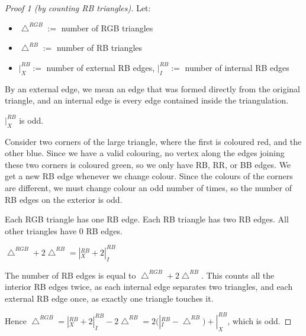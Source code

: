 	\begin{proof}[Proof 1 \emph{(by counting RB triangles)}]
		Let:
		\begin{itemize}
			\item $\bigtriangleup^{RGB} :=$ number of RGB triangles
			\item $\bigtriangleup^{RB} :=$ number of RB triangles
			\item $|^{RB}_X :=$ number of external RB edges, $|^{RB}_I :=$
				number of internal RB edges
		\end{itemize}

		By an external edge, we mean an edge that was formed directly from the
		original triangle, and an internal edge is every edge contained inside
		the triangulation.

		\begin{claim*}
			$|^{RB}_X$ is odd.
		\end{claim*}
		\begin{subproof}
			Consider two corners of the large triangle, where the first is
			coloured red, and the other blue. Since we have a valid colouring,
			no vertex along the edges joining these two corners is coloured
			green, so we only have RB, RR, or BB edges. We get a new RB edge
			whenever we change colour. Since the colours of the corners are
			different, we must change colour an odd number of times, so the
			number of RB edges on the exterior is odd.
		\end{subproof}

		\begin{claim*}
			Each RGB triangle has one RB edge. Each RB triangle has two RB
			edges. All other triangles have 0 RB edges.
		\end{claim*}

		\begin{claim*}
			$\bigtriangleup^{RGB} + 2\bigtriangleup^{RB} = |^{RB}_X +
			2|^{RB}_I$
		\end{claim*}
		\begin{subproof}
			The number of RB edges is equal to
			$\bigtriangleup^{RGB}+2\bigtriangleup^{RB}$. This counts all
			the interior RB edges twice, as each internal edge separates two
			triangles, and each external RB edge once, as exactly one triangle
			touches it.
		\end{subproof}

		Hence $\bigtriangleup^{RGB} = |^{RB}_X + 2|^{RB}_I -
		2\bigtriangleup^{RB} = 2(|^{RB}_I - \bigtriangleup^{RB}) +
		|^{RB}_X$, which is odd.
	\end{proof}

